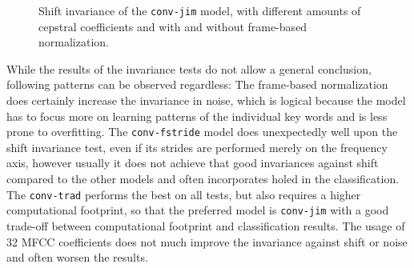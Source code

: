 \begin{figure}[!ht]
  \centering
  \caption{Shift invariance of the \texttt{conv-jim} model, with different amounts of cepstral coefficients and with and without frame-based normalization.}
  \label{fig:exp_fs_cepstral_tb_shift_conv-jim}
\end{figure}
\FloatBarrier
\noindent
While the results of the invariance tests do not allow a general conclusion, following patterns can be observed regardless:
The frame-based normalization does certainly increase the invariance in noise, which is logical because the model has to focus more on learning patterns of the individual key words and is less prone to overfitting.
The \texttt{conv-fstride} model does unexpectedly well upon the shift invariance test, even if its strides are performed merely on the frequency axis, 
however usually it does not achieve that good invariances against shift compared to the other models and often incorporates holed in the classification.
The \texttt{conv-trad} performs the best on all tests, but also requires a higher computational footprint, so that the preferred model is \texttt{conv-jim} with a good trade-off between computational footprint and classification results. 
The usage of 32 MFCC coefficients does not much improve the invariance against shift or noise and often worsen the results.



